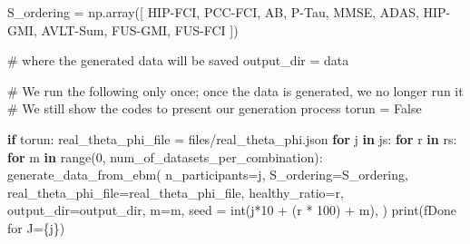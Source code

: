 \documentclass[
  letterpaper,
  DIV=11,
  numbers=noendperiod]{scrreprt}
\newenvironment{Shaded}{\begin{snugshade}}{\end{snugshade}}
\newcommand{\BuiltInTok}[1]{\textcolor[rgb]{0.00,0.23,0.31}{#1}}
\newcommand{\CommentTok}[1]{\textcolor[rgb]{0.37,0.37,0.37}{#1}}
\newcommand{\ControlFlowTok}[1]{\textcolor[rgb]{0.00,0.23,0.31}{\textbf{#1}}}
\newcommand{\DecValTok}[1]{\textcolor[rgb]{0.68,0.00,0.00}{#1}}
\newcommand{\KeywordTok}[1]{\textcolor[rgb]{0.00,0.23,0.31}{\textbf{#1}}}
\newcommand{\NormalTok}[1]{\textcolor[rgb]{0.00,0.23,0.31}{#1}}
\newcommand{\OperatorTok}[1]{\textcolor[rgb]{0.37,0.37,0.37}{#1}}
\newcommand{\SpecialCharTok}[1]{\textcolor[rgb]{0.37,0.37,0.37}{#1}}
\newcommand{\SpecialStringTok}[1]{\textcolor[rgb]{0.13,0.47,0.30}{#1}}
\newcommand{\StringTok}[1]{\textcolor[rgb]{0.13,0.47,0.30}{#1}}
\newcommand{\VariableTok}[1]{\textcolor[rgb]{0.07,0.07,0.07}{#1}}
\begin{document}
\begin{Shaded}
\begin{Highlighting}[]
\NormalTok{S\_ordering }\OperatorTok{=}\NormalTok{ np.array([}
    \StringTok{\textquotesingle{}HIP{-}FCI\textquotesingle{}}\NormalTok{, }\StringTok{\textquotesingle{}PCC{-}FCI\textquotesingle{}}\NormalTok{, }\StringTok{\textquotesingle{}AB\textquotesingle{}}\NormalTok{, }\StringTok{\textquotesingle{}P{-}Tau\textquotesingle{}}\NormalTok{, }\StringTok{\textquotesingle{}MMSE\textquotesingle{}}\NormalTok{, }\StringTok{\textquotesingle{}ADAS\textquotesingle{}}\NormalTok{, }
    \StringTok{\textquotesingle{}HIP{-}GMI\textquotesingle{}}\NormalTok{, }\StringTok{\textquotesingle{}AVLT{-}Sum\textquotesingle{}}\NormalTok{, }\StringTok{\textquotesingle{}FUS{-}GMI\textquotesingle{}}\NormalTok{, }\StringTok{\textquotesingle{}FUS{-}FCI\textquotesingle{}}
\NormalTok{])}

\CommentTok{\# where the generated data will be saved}
\NormalTok{output\_dir }\OperatorTok{=} \StringTok{\textquotesingle{}data\textquotesingle{}}

\CommentTok{\# We run the following only once; once the data is generated, we no longer run it}
\CommentTok{\# We still show the codes to present our generation process}
\NormalTok{torun }\OperatorTok{=} \VariableTok{False}
\end{Highlighting}
\end{Shaded}

\begin{Shaded}
\begin{Highlighting}[]
\ControlFlowTok{if}\NormalTok{ torun:}
\NormalTok{    real\_theta\_phi\_file }\OperatorTok{=} \StringTok{\textquotesingle{}files/real\_theta\_phi.json\textquotesingle{}}
    \ControlFlowTok{for}\NormalTok{ j }\KeywordTok{in}\NormalTok{ js:}
        \ControlFlowTok{for}\NormalTok{ r }\KeywordTok{in}\NormalTok{ rs:}
            \ControlFlowTok{for}\NormalTok{ m }\KeywordTok{in} \BuiltInTok{range}\NormalTok{(}\DecValTok{0}\NormalTok{, num\_of\_datasets\_per\_combination):}
\NormalTok{                generate\_data\_from\_ebm(}
\NormalTok{                    n\_participants}\OperatorTok{=}\NormalTok{j,}
\NormalTok{                    S\_ordering}\OperatorTok{=}\NormalTok{S\_ordering,}
\NormalTok{                    real\_theta\_phi\_file}\OperatorTok{=}\NormalTok{real\_theta\_phi\_file,}
\NormalTok{                    healthy\_ratio}\OperatorTok{=}\NormalTok{r,}
\NormalTok{                    output\_dir}\OperatorTok{=}\NormalTok{output\_dir,}
\NormalTok{                    m}\OperatorTok{=}\NormalTok{m,}
\NormalTok{                    seed }\OperatorTok{=} \BuiltInTok{int}\NormalTok{(j}\OperatorTok{*}\DecValTok{10} \OperatorTok{+}\NormalTok{ (r }\OperatorTok{*} \DecValTok{100}\NormalTok{) }\OperatorTok{+}\NormalTok{ m),}
\NormalTok{                )}
        \BuiltInTok{print}\NormalTok{(}\SpecialStringTok{f\textquotesingle{}Done for J=}\SpecialCharTok{\{}\NormalTok{j}\SpecialCharTok{\}}\SpecialStringTok{\textquotesingle{}}\NormalTok{)}
\end{Highlighting}
\end{Shaded}
\end{document}
